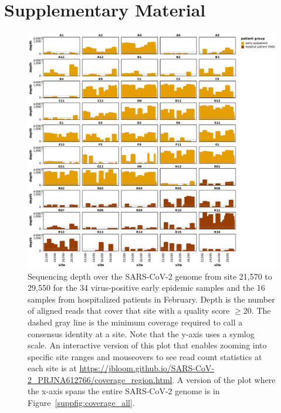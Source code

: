 \documentclass[9pt,twocolumn,twoside]{gsajnl_modified}
\begin{document}
\section{Supplementary Material}

\begin{figure}[h!]
\centering
\includegraphics[width=\linewidth]{figures/coverage_region.pdf}
\caption{Sequencing depth over the SARS-CoV-2 genome from site 21,570 to 29,550 for the 34 virus-positive early epidemic samples and the 16 samples from hospitalized patients in February.
Depth is the number of aligned reads that cover that site with a quality score $\ge$20.
The dashed gray line is the minimum coverage required to call a consensus identity at a site.
Note that the y-axis uses a symlog scale.
An interactive version of this plot that enables zooming into specific site ranges and mouseovers to see read count statistics at each site is at \url{https://jbloom.github.io/SARS-CoV-2_PRJNA612766/coverage_region.html}.
A version of the plot where the x-axis spans the entire SARS-CoV-2 genome is in Figure~\ref{suppfig:coverage_all}.
}
\label{suppfig:coverage}
\end{figure}
\end{document}
